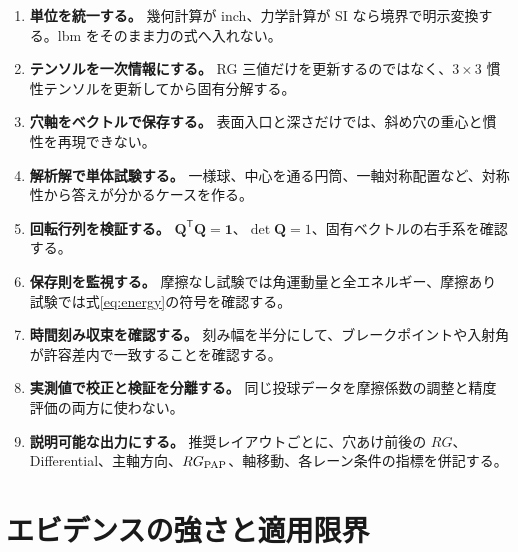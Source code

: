 \documentclass[11pt,a4paper]{article}
\newcommand{\mat}[1]{\bm{#1}}
\begin{document}
\begin{enumerate}
  \item \textbf{単位を統一する。} 幾何計算が inch、力学計算が SI なら境界で明示変換する。lbm をそのまま力の式へ入れない。
  \item \textbf{テンソルを一次情報にする。} RG 三値だけを更新するのではなく、$3\times3$ 慣性テンソルを更新してから固有分解する。
  \item \textbf{穴軸をベクトルで保存する。} 表面入口と深さだけでは、斜め穴の重心と慣性を再現できない。
  \item \textbf{解析解で単体試験する。} 一様球、中心を通る円筒、一軸対称配置など、対称性から答えが分かるケースを作る。
  \item \textbf{回転行列を検証する。} $\mat Q^{\mathsf T}\mat Q=\mat 1$、$\det\mat Q=1$、固有ベクトルの右手系を確認する。
  \item \textbf{保存則を監視する。} 摩擦なし試験では角運動量と全エネルギー、摩擦あり試験では式\eqref{eq:energy}の符号を確認する。
  \item \textbf{時間刻み収束を確認する。} 刻み幅を半分にして、ブレークポイントや入射角が許容差内で一致することを確認する。
  \item \textbf{実測値で校正と検証を分離する。} 同じ投球データを摩擦係数の調整と精度評価の両方に使わない。
  \item \textbf{説明可能な出力にする。} 推奨レイアウトごとに、穴あけ前後の $RG$、Differential、主軸方向、$RG_{\rm PAP}$、軸移動、各レーン条件の指標を併記する。
\end{enumerate}

\section{エビデンスの強さと適用限界}
\end{document}

